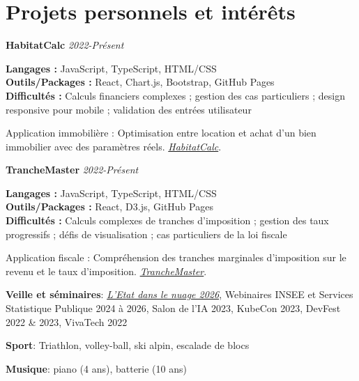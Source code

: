 \documentclass[a4paper,10pt]{article}
\newcommand{\resumeItem}[2]{
  \item\small{
    \textbf{#1}{: #2\vspace{-0.8pt}}
  }
}
\newcommand{\resumeSubItem}[2]{
    \small{\resumeItem{#1}{#2}\vspace{-4pt}}
	
}
\newcommand{\resumeSubHeadingListStart}{\begin{itemize}[leftmargin=*]}
\newcommand{\resumeSubHeadingListEnd}{\end{itemize}}
\newcommand{\resumeDetailedProject}[5]{
    \item\small{
        \textbf{#1} \hfill \textit{#2} \\ 
        \begin{minipage}{0.95\textwidth}
            \small{\textbf{Langages :} #3 \\ 
            \textbf{Outils/Packages :} #4 \\ 
            \textbf{Difficult\'es :} #5}
        \end{minipage}
    }
    \vspace{3pt}
}
\begin{document}
\section{Projets personnels et int\'er\^ets}
\vspace{0.5mm}
\begin{minipage}[t]{0.9865\textwidth}
\resumeSubHeadingListStart

\resumeDetailedProject
    {HabitatCalc}
    {2022-Pr\'esent}
    {JavaScript, TypeScript, HTML/CSS}
    {React, Chart.js, Bootstrap, GitHub Pages}
    {Calculs financiers complexes ; gestion des cas particuliers ; design responsive pour mobile ; validation des entr\'ees utilisateur}
    {Application immobili\`ere : Optimisation entre location et achat d'un bien immobilier avec des param\`etres r\'eels. \href{https://odysseu.github.io/HabitatCalc/}{\textit{HabitatCalc}}}.

\resumeDetailedProject
    {TrancheMaster}
    {2022-Pr\'esent}
    {JavaScript, TypeScript, HTML/CSS}
    {React, D3.js, GitHub Pages}
    {Calculs complexes de tranches d'imposition ; gestion des taux progressifs ; d\'efis de visualisation ; cas particuliers de la loi fiscale}
    {Application fiscale : Compr\'ehension des tranches marginales d'imposition sur le revenu et le taux d'imposition. \href{https://odysseu.github.io/TrancheMaster/}{\textit{TrancheMaster}}}.

  \resumeSubItem{Veille et s\'eminaires}{\href{https://www.numerique.gouv.fr/agenda/etat-dans-le-nuage-2026/}{\textit{L'Etat dans le nuage 2026}}, Webinaires INSEE et Services Statistique Publique 2024 \`a 2026, Salon de l'IA 2023, KubeCon 2023, DevFest 2022 \& 2023, VivaTech 2022}
  \resumeSubItem{Sport}{Triathlon, volley-ball, ski alpin, escalade de blocs}
  \resumeSubItem{Musique}{piano (4 ans), batterie (10 ans)}
\resumeSubHeadingListEnd
\end{minipage}


\end{document}
